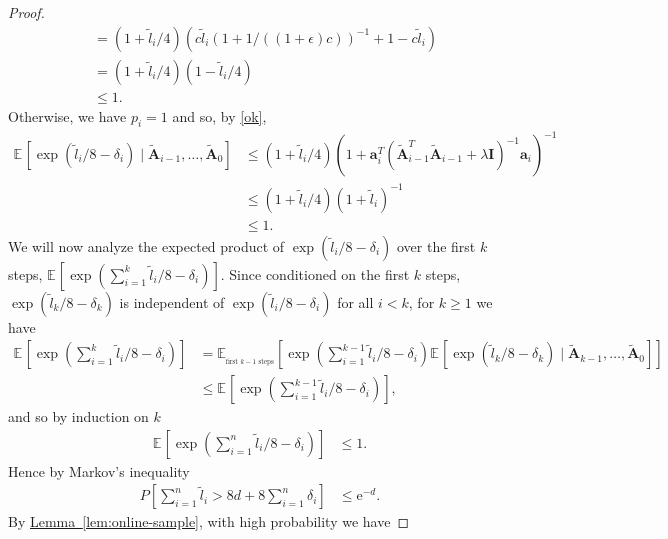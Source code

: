 \documentclass[11pt]{article}
\numberwithin{equation}{section}
\theoremstyle{definition}
\theoremstyle{plain}
\newcommand{\eee}{\mathrm e}
\newcommand{\expref}[2]{\hyperref[#2]{#1~\ref{#2}}}
\newcommand{\bv}[1]{\mathbf{#1}}
\newcommand{\expct}[3]{\mathbb{E}_{{#1}_{#2}}\left[#3\right]}
\newcommand{\prob}[1]{P\left[#1\right]}
\begin{document}
\begin{proof}
\begin{align*}
                                                    &= (1 + \tilde{l}_i/4) (c\tilde{l}_i (1 + 1/((1+\epsilon)c))^{-1} + 1 - c\tilde{l}_i)\\
                                                    &= (1 + \tilde{l}_i/4) (1 - \tilde{l}_i/4)\\
                                                    &\leq 1.
    \end{align*}
    Otherwise, we have $p_i = 1$ and so, by \eqref{ok},
    \begin{align*}
        \expct{}{}{\exp(\tilde{l}_i/8 - \delta_i) \mid \bv{\tilde A}_{i-1},\ldots, \bv{\tilde A}_{0}} &\leq (1 + \tilde{l}_i/4) (1 + \bv{a}_i^T (\bv{\tilde{A}}_{i-1}^T \bv{\tilde{A}}_{i-1} + \lambda \bv{I})^{-1} \bv{a}_i)^{-1} \\
                                                    &\leq (1 + \tilde{l}_i/4) (1 + \tilde{l}_i)^{-1} \\
                                                    &\leq 1.
    \end{align*}
    We will now analyze the expected product of $\exp(\tilde{l}_i/8 - \delta_i)$ over the first $k$ steps, $\expct{}{}{\exp\left(\sum_{i=1}^k \tilde{l}_i/8 - \delta_i\right)}$.
    Since conditioned on the first $k$ steps, $\exp(\tilde{l}_k/8 - \delta_k)$ is independent of $\exp(\tilde{l}_i/8 - \delta_i)$ for all $i < k$, for $k \geq 1$ we have %
    \begin{align*}
        \expct{}{}{\exp\left(\sum_{i=1}^k \tilde{l}_i/8 - \delta_i\right)} &= \expct{}{\text{first $k-1$ steps}}{\exp\left(\sum_{i=1}^{k-1} \tilde{l}_i/8 - \delta_i\right)\expct{}{}{\exp(\tilde{l}_k/8 - \delta_k) \mid \bv{\tilde A}_{k-1},\ldots, \bv{\tilde A}_{0}}}\\
                                                                         &\leq \expct{}{}{\exp\left(\sum_{i=1}^{k-1} \tilde{l}_i/8 - \delta_i\right)},
    \end{align*}
    and so by induction on $k$
    \begin{align*}
        \expct{}{}{\exp\left(\sum_{i=1}^n \tilde{l}_i/8 - \delta_i\right)} &\leq 1.
    \end{align*}
    Hence by Markov's inequality
    \begin{align*}
        \prob{\sum_{i=1}^n \tilde{l}_i > 8d + 8\sum_{i=1}^n \delta_i} &\leq \eee^{-d}.
    \end{align*}
    By \expref{Lemma}{lem:online-sample}, with high probability we have

\end{proof}
\end{document}
